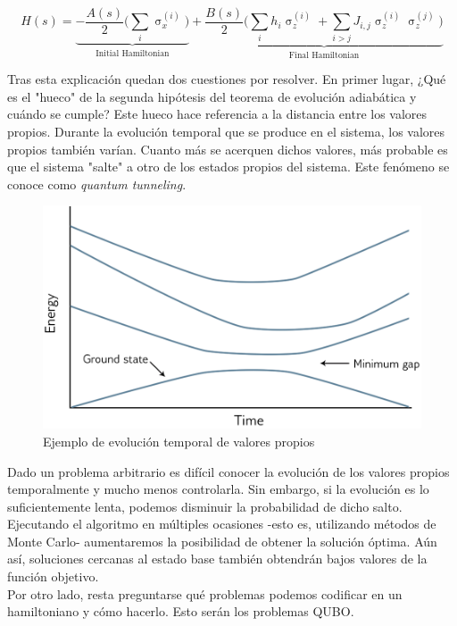 \documentclass[11pt]{article}
\begin{document}
\[ H(s) = \underbrace{- \frac{A(s)}{2} \bigg( \sum_i \upsigma_x^{(i)} \bigg)}_\text{Initial Hamiltonian} 
+ \underbrace{\frac{B(s)}{2} \bigg( \sum_i h_i \upsigma_z^{(i)} + \sum_ {i > j} J_{i,j} \upsigma_z^{(i)} \upsigma_z^{(j)} \bigg)}_\text{Final Hamiltonian} \]

Tras esta explicación quedan dos cuestiones por resolver. En primer lugar, ¿Qué es el "hueco" de la segunda hipótesis del teorema de evolución adiabática y cuándo se cumple? Este hueco hace referencia a la distancia entre los valores propios. Durante la evolución temporal que se produce en el sistema, los valores propios también varían. Cuanto más se acerquen dichos valores, más probable es que el sistema "salte" a otro de los estados propios del sistema. Este fenómeno se conoce como \emph{quantum tunneling}.

\begin{figure}[h]
	\includegraphics[scale=.3]{figures/dwave-eigenspectrum.png}
	\centering
	\caption{Ejemplo de evolución temporal de valores propios}
	\label{fig:dwave-eigenspectrum}
\end{figure}

Dado un problema arbitrario es difícil conocer la evolución de los valores propios temporalmente y mucho menos controlarla. Sin embargo, si la evolución es lo suficientemente lenta, podemos disminuir la probabilidad de dicho salto. Ejecutando el algoritmo en múltiples ocasiones -esto es, utilizando métodos de Monte Carlo- aumentaremos la posibilidad de obtener la solución óptima. Aún así, soluciones cercanas al estado base también obtendrán bajos valores de la función objetivo. \\

Por otro lado, resta preguntarse qué problemas podemos codificar en un hamiltoniano y cómo hacerlo. Esto serán los problemas QUBO.
\end{document}
